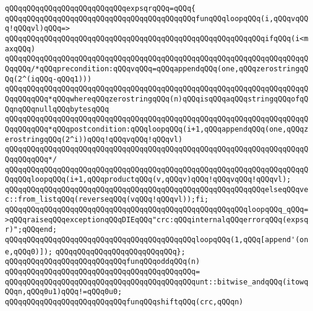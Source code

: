 \newline
\verb|qQQqqQQqqQQqqQQqqQQqqQQqqQQqexpsqrqQQq=qQQq{|\newline
\verb|qQQqqQQqqQQqqQQqqQQqqQQqqQQqqQQqqQQqqQQqqQQqfunqQQqloopqQQq(i,qQQqvqQQq!qQQqvl)qQQq=>|\newline
\verb|qQQqqQQqqQQqqQQqqQQqqQQqqQQqqQQqqQQqqQQqqQQqqQQqqQQqqQQqqQQqifqQQq(i<maxqQQq)|\newline
\verb|qQQqqQQqqQQqqQQqqQQqqQQqqQQqqQQqqQQqqQQqqQQqqQQqqQQqqQQqqQQqqQQqqQQqqQQqqQQq/*qQQqprecondition:qQQqvqQQq=qQQqappendqQQq(one,qQQqzerostringqQQq(2^(iqQQq-qQQq1)))|\newline
\verb|qQQqqQQqqQQqqQQqqQQqqQQqqQQqqQQqqQQqqQQqqQQqqQQqqQQqqQQqqQQqqQQqqQQqqQQqqQQqqQQq*qQQqwhereqQQqzerostringqQQq(n)qQQqisqQQqaqQQqstringqQQqofqQQqnqQQqnullqQQqbytesqQQq|\newline
\verb|qQQqqQQqqQQqqQQqqQQqqQQqqQQqqQQqqQQqqQQqqQQqqQQqqQQqqQQqqQQqqQQqqQQqqQQqqQQqqQQq*qQQqpostcondition:qQQqloopqQQq(i+1,qQQqappendqQQq(one,qQQqzerostringqQQq(2^i))qQQq!qQQqvqQQq!qQQqvl)|\newline
\verb|qQQqqQQqqQQqqQQqqQQqqQQqqQQqqQQqqQQqqQQqqQQqqQQqqQQqqQQqqQQqqQQqqQQqqQQqqQQqqQQq*/|\newline
\verb|qQQqqQQqqQQqqQQqqQQqqQQqqQQqqQQqqQQqqQQqqQQqqQQqqQQqqQQqqQQqqQQqqQQqqQQqqQQqloopqQQq(i+1,qQQqproductqQQq(v,qQQqv)qQQq!qQQqvqQQq!qQQqvl);|\newline
\verb|qQQqqQQqqQQqqQQqqQQqqQQqqQQqqQQqqQQqqQQqqQQqqQQqqQQqqQQqqQQqelseqQQqvec::from_listqQQq(reverseqQQq(vqQQq!qQQqvl));fi;|\newline
\verb|qQQqqQQqqQQqqQQqqQQqqQQqqQQqqQQqqQQqqQQqqQQqqQQqqQQqqQQqloopqQQq_qQQq=>qQQqraiseqQQqexceptionqQQqDIEqQQq"crc:qQQqinternalqQQqerrorqQQq(expsqr)";qQQqend;|\newline
\newline
\verb|qQQqqQQqqQQqqQQqqQQqqQQqqQQqqQQqqQQqqQQqqQQqloopqQQq(1,qQQq[append'(one,qQQq0)]);|\newline
\verb|qQQqqQQqqQQqqQQqqQQqqQQqqQQq};|\newline
\newline
\verb|qQQqqQQqqQQqqQQqqQQqqQQqqQQqfunqQQqoddqQQq(n)|\newline
\verb|qQQqqQQqqQQqqQQqqQQqqQQqqQQqqQQqqQQqqQQqqQQq=|\newline
\verb|qQQqqQQqqQQqqQQqqQQqqQQqqQQqqQQqqQQqqQQqqQQqunt::bitwise_andqQQq(itowqQQqn,qQQq0u1)qQQq!=qQQq0u0;|\newline
\newline
\verb|qQQqqQQqqQQqqQQqqQQqqQQqqQQqfunqQQqshiftqQQq(crc,qQQqn)|\newline
